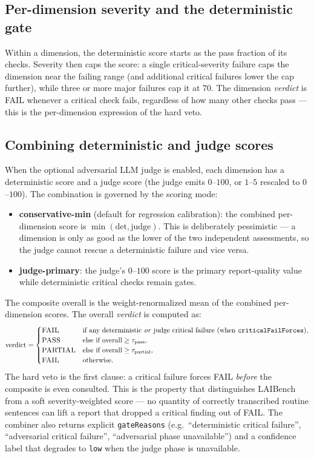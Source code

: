 \documentclass[11pt]{article}
\newcommand{\dimname}[1]{\textsc{#1}}
\begin{document}
\subsection{Per-dimension severity and the deterministic gate}

Within a dimension, the deterministic score starts as the pass fraction of its
checks. Severity then caps the score: a single critical-severity failure caps the
dimension near the failing range (and additional critical failures lower the cap
further), while three or more major failures cap it at $70$. The dimension
\emph{verdict} is \dimname{FAIL} whenever a critical check fails, regardless of
how many other checks pass --- this is the per-dimension expression of the hard
veto.

\subsection{Combining deterministic and judge scores}

When the optional adversarial LLM judge is enabled, each dimension has a
deterministic score and a judge score (the judge emits $0$--$100$, or $1$--$5$
rescaled to $0$--$100$). The combination is governed by the scoring mode:

\begin{itemize}[leftmargin=*]
\item \textbf{conservative-min} (default for regression calibration): the
combined per-dimension score is $\min(\text{det},\text{judge})$. This is
deliberately pessimistic --- a dimension is only as good as the lower of the two
independent assessments, so the judge cannot rescue a deterministic failure and
vice versa.
\item \textbf{judge-primary}: the judge's $0$--$100$ score is the primary
report-quality value while deterministic critical checks remain gates.
\end{itemize}

The composite overall is the weight-renormalized mean of the combined
per-dimension scores. The overall \emph{verdict} is computed as:
\[
\text{verdict}=
\begin{cases}
\dimname{FAIL} & \text{if any deterministic \emph{or} judge critical failure (when } \texttt{criticalFailForces}),\\
\dimname{PASS} & \text{else if } \text{overall}\ge \tau_{\text{pass}},\\
\dimname{PARTIAL} & \text{else if } \text{overall}\ge \tau_{\text{partial}},\\
\dimname{FAIL} & \text{otherwise.}
\end{cases}
\]
The hard veto is the first clause: a critical failure forces \dimname{FAIL}
\emph{before} the composite is even consulted. This is the property that
distinguishes LAIBench from a soft severity-weighted score --- no quantity of
correctly transcribed routine sentences can lift a report that dropped a
critical finding out of \dimname{FAIL}. The combiner also returns explicit
\texttt{gateReasons} (e.g.\ ``deterministic critical failure'', ``adversarial
critical failure'', ``adversarial phase unavailable'') and a confidence label
that degrades to \texttt{low} when the judge phase is unavailable.
\end{document}
